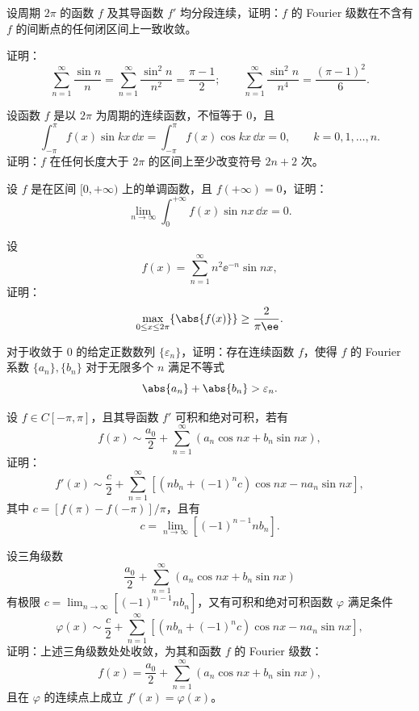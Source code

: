 \begin{xreferenceproblem}[9]
设周期 $2\pi$ 的函数 $f$ 及其导函数 $f'$ 均分段连续，证明：$f$ 的 Fourier 级数在不含有 $f$ 的间断点的任何闭区间上一致收敛。
\end{xreferenceproblem}

\begin{xreferenceproblem}[10]
证明：
  \[
    \sum_{n=1}^{\infty}\frac{\sin n}{n}
    =\sum_{n=1}^{\infty}\frac{\sin^2n}{n^2}
    =\frac{\pi-1}{2};
    \qquad
    \sum_{n=1}^{\infty}\frac{\sin^2n}{n^4}=\frac{(\pi-1)^2}{6}.
  \]
\end{xreferenceproblem}

\begin{xreferenceproblem}[11]
设函数 $f$ 是以 $2\pi$ 为周期的连续函数，不恒等于 0，且
  \[
    \int_{-\pi}^{\pi}f(x)\sin kx\,\dd x
    =\int_{-\pi}^{\pi}f(x)\cos kx\,\dd x=0,
    \qquad k=0,1,\ldots,n.
  \]
  证明：$f$ 在任何长度大于 $2\pi$ 的区间上至少改变符号 $2n+2$ 次。
\end{xreferenceproblem}

\begin{xreferenceproblem}[12]
设 $f$ 是在区间 $[0,+\infty)$ 上的单调函数，且 $f(+\infty)=0$，证明：
  \[
    \lim_{n\to\infty}\int_0^{+\infty}f(x)\sin nx\,\dd x=0.
  \]
\end{xreferenceproblem}

\begin{xreferenceproblem}[13]
设
  \[
    f(x)=\sum_{n=1}^{\infty}n^2\ee^{-n}\sin nx,
  \]
  证明：
  \[
    \max_{0\le x\le2\pi}\{\abs{f(x)}\}\ge\frac2{\pi\ee}.
  \]
\end{xreferenceproblem}

\begin{xreferenceproblem}[14]
对于收敛于 0 的给定正数数列 $\{\varepsilon_n\}$，证明：存在连续函数 $f$，使得 $f$ 的 Fourier 系数 $\{a_n\},\{b_n\}$ 对于无限多个 $n$ 满足不等式
  \[
    \abs{a_n}+\abs{b_n}>\varepsilon_n.
  \]
\end{xreferenceproblem}

\begin{xreferenceproblem}[15]
设 $f\in C[-\pi,\pi]$，且其导函数 $f'$ 可积和绝对可积，若有
  \[
    f(x)\sim\frac{a_0}{2}+\sum_{n=1}^{\infty}(a_n\cos nx+b_n\sin nx),
  \]
  证明：
  \[
    f'(x)\sim\frac c2+\sum_{n=1}^{\infty}[(nb_n+(-1)^nc)\cos nx-na_n\sin nx],
  \]
  其中 $c=[f(\pi)-f(-\pi)]/\pi$，且有
  \[
    c=\lim_{n\to\infty}[(-1)^{n-1}nb_n].
  \]
\end{xreferenceproblem}

\begin{xreferenceproblem}[16]
设三角级数
  \[
    \frac{a_0}{2}+\sum_{n=1}^{\infty}(a_n\cos nx+b_n\sin nx)
  \]
  有极限 $c=\lim_{n\to\infty}[(-1)^{n-1}nb_n]$，又有可积和绝对可积函数 $\varphi$ 满足条件
  \[
    \varphi(x)\sim\frac c2+\sum_{n=1}^{\infty}[(nb_n+(-1)^nc)\cos nx-na_n\sin nx],
  \]
  证明：上述三角级数处处收敛，为其和函数 $f$ 的 Fourier 级数：
  \[
    f(x)=\frac{a_0}{2}+\sum_{n=1}^{\infty}(a_n\cos nx+b_n\sin nx),
  \]
  且在 $\varphi$ 的连续点上成立 $f'(x)=\varphi(x)$。
\end{xreferenceproblem}

